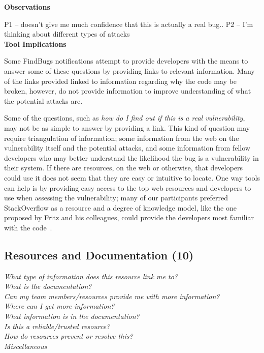 \documentclass[conference]{IEEEtran}
\begin{document}
\noindent\textbf{Observations}

P1 -- doesn't give me much confidence that this is actually a real bug..
P2 -- I'm thinking about different types of attacks 
\\

\noindent\textbf{Tool Implications}

Some FindBugs notifications attempt to provide developers with the means to answer some of these questions by providing links to relevant information. 
Many of the links provided linked to information regarding why the code may be broken, however, do not provide information to improve understanding of what the potential attacks are.  

Some of the questions, such as \textit{how do I find out if this is a real vulnerability}, may not be as simple to answer by providing a link. 
This kind of question may require triangulation of information; some information from the web on the vulnerability itself and the potential attacks, and some information from fellow developers who may better understand the likelihood the bug is a vulnerability in their system. 
If there are resources, on the web or otherwise, that developers could use it does not seem that they are easy or intuitive to locate. 
One way tools can help is by providing easy access to the top web resources and developers to use when assessing the vulnerability; many of our participants preferred StackOverflow as a resource and a degree of knowledge model, like the one proposed by Fritz and his colleagues, could provide the developers most familiar with the code~\cite{fritz2010degree}.



\noindent\subsection{\textbf{Resources and Documentation (10)}}\label{rd}

\noindent\emph{What type of information does this resource link me to?} \\
\emph{What is the documentation?} \\
\emph{Can my team members/resources provide me with more information?} \\
\emph{Where can I get more information?} \\
\emph{What information is in the documentation?} \\
\emph{Is this a reliable/trusted resource?} \\
\emph{How do resources prevent or resolve this?} \\
\emph{Miscellaneous} \\
\end{document}
